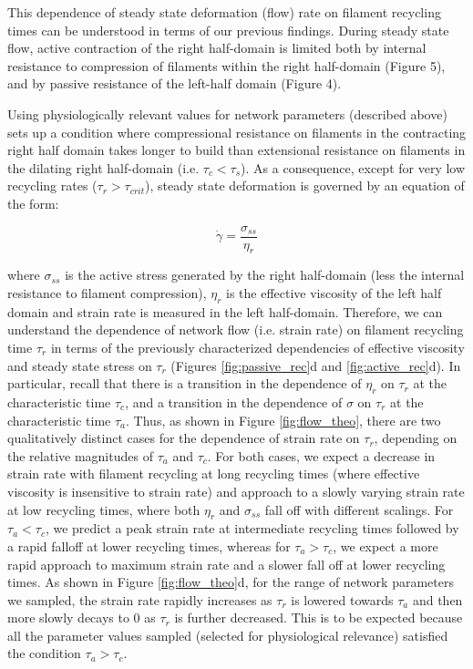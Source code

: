 \documentclass[10pt,letterpaper]{article}
\begin{document}
This dependence of steady state deformation (flow) rate on filament recycling times can be understood in terms of our previous findings.  During steady state flow, active contraction of the right half-domain is limited both by internal resistance to compression of filaments within the right half-domain (Figure 5), and by passive resistance of the left-half domain (Figure 4).  

Using physiologically relevant values for network parameters (described above) sets up a condition where compressional resistance on filaments in the contracting right half domain takes longer to build than extensional resistance on filaments in the dilating right half-domain (i.e. $\tau_c<\tau_s$). As a consequence, except for very low recycling rates ($\tau_r>\tau_{crit}$),  steady state deformation is governed by an equation of the form:

\begin{equation}
\label{eqn:everybody_knows_that}
\dot{\gamma} = \frac{\sigma_{ss}}{\eta_r}  
\end{equation}

where $\sigma_{ss}$ is the active stress generated by the right half-domain (less the internal resistance to filament compression), $\eta_r$ is the effective viscosity of the left half domain and strain rate is measured in the left half-domain.  Therefore, we can understand the dependence of network flow (i.e. strain rate) on filament recycling time $\tau_r$ in terms of the previously characterized dependencies of effective viscosity and steady state stress on $\tau_r$ (Figures \ref{fig:passive_rec}d and \ref{fig:active_rec}d). In particular, recall that there is a transition in the dependence of $\eta_r$ on $\tau_r$ at the characteristic time $\tau_c$, and a transition in the dependence of $\sigma$ on $\tau_r$ at the characteristic time $\tau_a$.  Thus, as shown in Figure \ref{fig:flow_theo},  there are two qualitatively distinct cases for the dependence of strain rate on $\tau_r$, depending on the relative magnitudes of $\tau_a$ and $\tau_c$.  For both cases, we expect a decrease in strain rate with filament recycling at long recycling times (where effective viscosity is insensitive to strain rate)  and approach to a slowly varying strain rate at low recycling times, where both $\eta_r$ and $\sigma_{ss}$ fall off with different scalings. For $\tau_a < \tau_c$, we predict a peak strain rate at intermediate recycling times followed by a rapid falloff at lower recycling times, whereas for $\tau_a > \tau_c$, we expect a more rapid approach to maximum strain rate and a slower fall off at lower recycling times.  As shown in Figure \ref{fig:flow_theo}d, for the range of network parameters we sampled, the strain rate rapidly increases as $\tau_r$ is lowered towards $\tau_a$ and then more slowly decays to 0 as $\tau_r$ is further decreased.  This is to be expected because all the parameter values sampled (selected for physiological relevance) satisfied the condition $\tau_a > \tau_c$.
\end{document}
